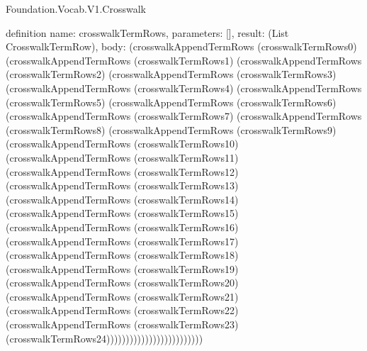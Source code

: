 \begin{lexlean}{Foundation.Vocab.V1.Crosswalk}
\begin{semanticmodule}
definition{
  name: crosswalkTermRows,
  parameters: [],
  result: (List CrosswalkTermRow),
  body: (crosswalkAppendTermRows (crosswalkTermRows0) (crosswalkAppendTermRows (crosswalkTermRows1) (crosswalkAppendTermRows (crosswalkTermRows2) (crosswalkAppendTermRows (crosswalkTermRows3) (crosswalkAppendTermRows (crosswalkTermRows4) (crosswalkAppendTermRows (crosswalkTermRows5) (crosswalkAppendTermRows (crosswalkTermRows6) (crosswalkAppendTermRows (crosswalkTermRows7) (crosswalkAppendTermRows (crosswalkTermRows8) (crosswalkAppendTermRows (crosswalkTermRows9) (crosswalkAppendTermRows (crosswalkTermRows10) (crosswalkAppendTermRows (crosswalkTermRows11) (crosswalkAppendTermRows (crosswalkTermRows12) (crosswalkAppendTermRows (crosswalkTermRows13) (crosswalkAppendTermRows (crosswalkTermRows14) (crosswalkAppendTermRows (crosswalkTermRows15) (crosswalkAppendTermRows (crosswalkTermRows16) (crosswalkAppendTermRows (crosswalkTermRows17) (crosswalkAppendTermRows (crosswalkTermRows18) (crosswalkAppendTermRows (crosswalkTermRows19) (crosswalkAppendTermRows (crosswalkTermRows20) (crosswalkAppendTermRows (crosswalkTermRows21) (crosswalkAppendTermRows (crosswalkTermRows22) (crosswalkAppendTermRows (crosswalkTermRows23) (crosswalkTermRows24)))))))))))))))))))))))))
}
\end{semanticmodule}
\end{lexlean}
